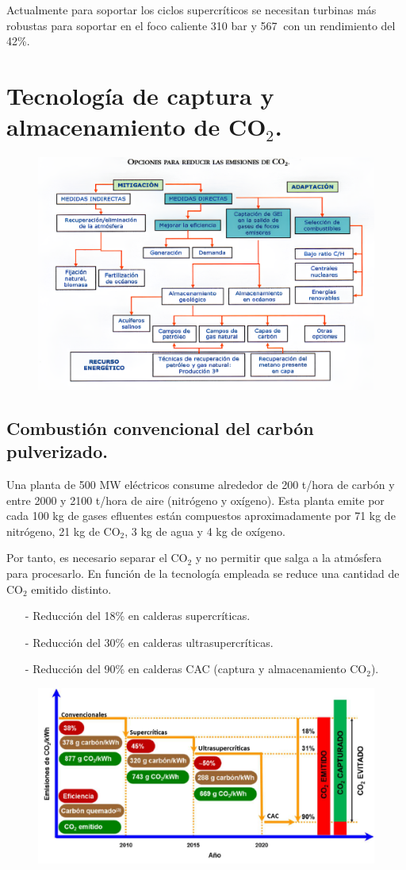 Actualmente para soportar los ciclos supercríticos se necesitan turbinas más robustas para soportar en el foco caliente 310 bar y 567\grado $\ $  con un rendimiento del 42\%.
\newpage
\section{Tecnología de captura y almacenamiento de CO$_2$.}
\begin{figure}[H]
	\centering
	\includegraphics[width=0.7\linewidth]{res/tema3/reduccionCO2Opt}
	\label{fig:reduccionco2opt}
\end{figure}

\subsection{Combustión convencional del carbón pulverizado.}
Una planta de 500 MW eléctricos consume alrededor de 200 t/hora de carbón y entre
2000 y 2100 t/hora de aire (nitrógeno y oxígeno). Esta planta emite por cada 100 kg de gases efluentes están compuestos aproximadamente por 71 kg de
nitrógeno, 21 kg de CO$_2$, 3 kg de agua y 4 kg de oxígeno.

Por tanto, es necesario separar el CO$_2$ y no permitir que salga a la atmósfera para procesarlo. En función de la tecnología empleada se reduce una cantidad de CO$_2$ emitido distinto.
\begin{itemize}
	\item [-] Reducción del 18\% en calderas supercríticas.
	\item [-] Reducción del 30\% en calderas ultrasupercríticas.
	\item [-] Reducción del 90\% en calderas CAC (captura y almacenamiento CO$_2$).
\end{itemize}
\begin{figure}[H]
	\centering
	\includegraphics[width=0.7\linewidth]{res/tema3/comparacion calderas}
	\label{fig:comparacion-calderas}
\end{figure}

